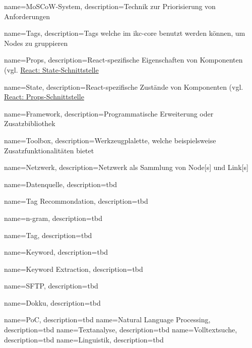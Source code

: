 {
    name=MoSCoW-System,
    description={Technik zur Priorisierung von Anforderungen}
    \cite{moscow:hardvard}
}

{
    name=Tags,
    description={Tags welche im \gls{ikc-core} benutzt werden können, um Nodes zu gruppieren}
}

{
    name=Props,
    description={React-spezifische Eigenschaften von Komponenten (vgl. \hyperref[props]{React: State-Schnittstelle}}
}

{
    name=State,
    description={React-spezifische Zustände von Komponenten (vgl. \hyperref[props]{React: Props-Schnittstelle}}
}

{
    name=Framework,
    description={Programmatische Erweiterung oder Zusatzbibliothek}
}

{
    name=Toolbox,
    description={Werkzeugplalette, welche beispielsweise Zu\-satz\-funk\-tio\-na\-li\-tät\-en bietet}
}

{
    name=Netzwerk,
    description={Netzwerk als Sammlung von \gls{Node}[s] und \gls{Link}[s]}
}

{
    name=Datenquelle,
    description={tbd}
    \cite{dropbox}
}

{
    name=Tag Recommondation,
    description={tbd}
    \cite{dropbox}
}

{
    name=n-gram,
    description={tbd}
    \cite{dropbox}
}

{
    name=Tag,
    description={tbd}
    \cite{dropbox}
}

{
    name=Keyword,
    description={tbd}
    \cite{dropbox}
}

{
    name=Keyword Extraction,
    description={tbd}
    \cite{dropbox}
}

{
    name=SFTP,
    description={tbd}
    \cite{dropbox}
}

{
    name=Dokku,
    description={tbd}
    \cite{dropbox}
}

{
    name=PoC,
    description={tbd}
}
{
    name=Natural Language Processing,
    description={tbd}
}
{
    name=Textanalyse,
    description={tbd}
}
{
    name=Volltextsuche,
    description={tbd}
}
{
    name=Linguistik,
    description={tbd}
}

